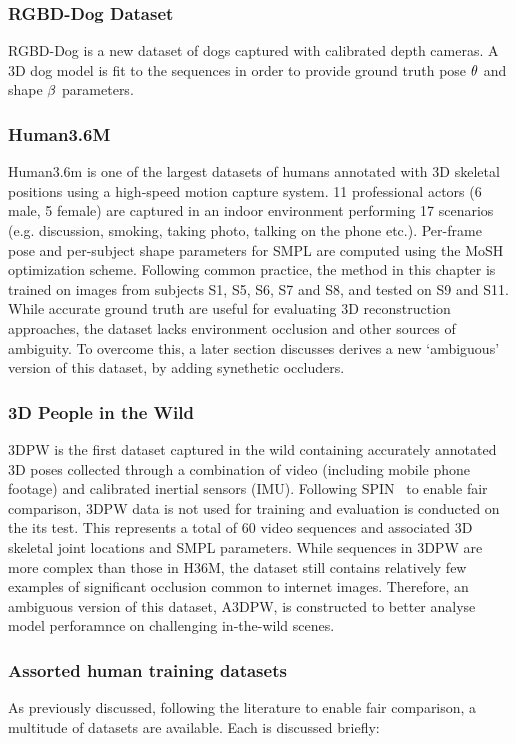 \subsubsection{RGBD-Dog Dataset}

RGBD-Dog is a new dataset of dogs captured with calibrated depth cameras. A 3D dog model is fit to the sequences in order to provide ground truth pose $\theta$ and shape $\beta$ parameters. 

\subsubsection{Human3.6M}

Human3.6m is one of the largest datasets of humans annotated with 3D skeletal positions using a high-speed motion capture system. 11 professional actors (6 male, 5 female) are captured in an indoor environment performing 17 scenarios (e.g. discussion, smoking, taking photo, talking on the phone etc.). Per-frame pose and per-subject shape parameters for SMPL are computed using the MoSH~\cite{xxx} optimization scheme. Following common practice, the method in this chapter is trained on images from subjects S1, S5, S6, S7 and S8, and tested on S9 and S11. While accurate ground truth are useful for evaluating 3D reconstruction approaches, the dataset lacks environment occlusion and other sources of ambiguity. To overcome this, a later section discusses derives a new `ambiguous' version of this dataset, by adding synethetic occluders. 

\subsubsection{3D People in the Wild}
3DPW is the first dataset captured in the wild containing accurately annotated 3D poses collected through a combination of video (including mobile phone footage) and calibrated inertial sensors (IMU). Following SPIN~\cite{kolotouros19convolutional} to enable fair comparison, 3DPW data is not used for training and evaluation is conducted on the its test. This represents a total of 60 video sequences and associated 3D skeletal joint locations and SMPL parameters. While sequences in 3DPW are more complex than those in H36M, the dataset still contains relatively few examples of significant occlusion common to internet images. Therefore, an ambiguous version of this dataset, A3DPW, is constructed to better analyse model perforamnce on challenging in-the-wild scenes.

\subsubsection{Assorted human training datasets}
As previously discussed, following the literature to enable fair comparison, a multitude of datasets are available. Each is discussed briefly:

